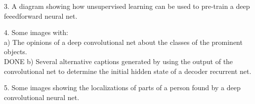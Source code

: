 \documentclass[]{article}
\begin{document}
3. A diagram showing how unsupervised learning can be used to pre-train a
deep feeedforward neural net.

4. Some images with:\\ a) The opinions of a deep convolutional net about
the classes of the prominent objects.\\ 
DONE b) Several alternative captions
generated by using the output of the convolutional net to determine the
initial hidden state of a decoder recurrent net.
 
5. Some images showing the localizations of parts of a person found by a
deep convolutional neural net.\\

\fi



\end{document}
